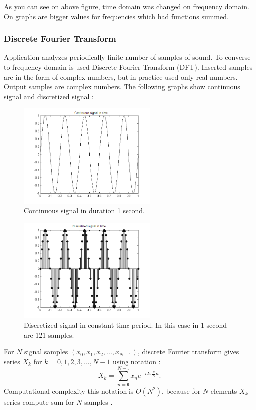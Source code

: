 \documentclass[11pt,titlepage]{article}
\theoremstyle{plain}
\begin{document}
As you can see on above figure, time domain was changed on frequency domain. On graphs are bigger values for frequencies which had functions summed.

\subsubsection{Discrete Fourier Transform}
Application analyzes periodically finite number of samples of sound. To converse to frequency domain is used Discrete Fourier Transform (DFT). Inserted samples are in the form of complex numbers, but in practice used only real numbers. Output samples are complex numbers. The following graphs show continuous signal and discretized signal \cite{fourier}:

\begin{figure}[H]
	\centering
	\includegraphics[width=0.6\textwidth]{img/continues}
	\caption{Continuous signal in duration 1 second.}
	\label{fig:F6}
\end{figure}

\begin{figure}[H]
	\centering
	\includegraphics[width=0.6\textwidth]{img/descrete}
	\caption{Discretized signal in constant time period. In this case in 1 second are 121 samples.}
	\label{fig:F7}
\end{figure}

For $N$ signal samples $(x_0,x_1,x_2,...,x_{N-1})$, discrete Fourier transform gives series $X_k$ for $k = 0,1, 2, 3, ..., N-1$ using notation \cite{fourier}:
\begin{equation}
	X_k =  \sum\limits_{n=0}^{N-1} x_ne^{-i2\pi \frac{k}{N}n}.
\end{equation}
Computational complexity this notation is $O(N^2)$, because for $N$ elements $X_k$ series compute sum for $N$ samples \cite{fast_fourier}.
\end{document}
